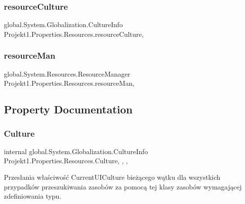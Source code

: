 \subsubsection{\texorpdfstring{resourceCulture}{resourceCulture}}
{\footnotesize\ttfamily global.\+System.\+Globalization.\+Culture\+Info Projekt1.\+Properties.\+Resources.\+resource\+Culture\hspace{0.3cm}{\ttfamily [static]}, {\ttfamily [private]}}

\mbox{\label{class_projekt1_1_1_properties_1_1_resources_a5a79eff92141b0c0f8bf45c028747798}} 
\subsubsection{\texorpdfstring{resourceMan}{resourceMan}}
{\footnotesize\ttfamily global.\+System.\+Resources.\+Resource\+Manager Projekt1.\+Properties.\+Resources.\+resource\+Man\hspace{0.3cm}{\ttfamily [static]}, {\ttfamily [private]}}



\subsection{Property Documentation}
\mbox{\label{class_projekt1_1_1_properties_1_1_resources_ab59ba363b95dcad50c46b73eb5ce71a2}} 
\subsubsection{\texorpdfstring{Culture}{Culture}}
{\footnotesize\ttfamily internal global.\+System.\+Globalization.\+Culture\+Info Projekt1.\+Properties.\+Resources.\+Culture\hspace{0.3cm}{\ttfamily [static]}, {\ttfamily [get]}, {\ttfamily [set]}, {\ttfamily [private]}}



Przesłania właściwość Current\+U\+I\+Culture bieżącego wątku dla wszystkich przypadków przeszukiwania zasobów za pomocą tej klasy zasobów wymagającej zdefiniowania typu. 

